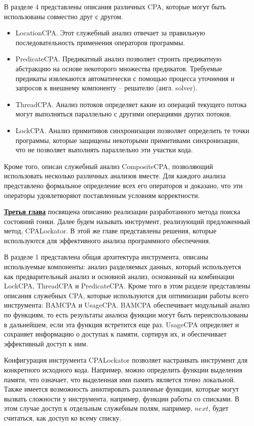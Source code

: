 В разделе 4 представлены описания различных CPA, которые могут быть использованы совместно друг с другом.
\begin{itemize}
\item LocationCPA. Этот служебный анализ отвечает за правильную последовательность применения операторов программы. 
\item PredicateCPA. Предикатный анализ позволяет строить предикатную абстракцию на основе некоторого множества предикатов. 
Требуемые предикаты извлекаются автоматически с помощью процесса уточнения и запросов к внешнему компоненту -- решателю (англ. solver).
\item ThreadCPA. Анализ потоков определяет какие из операций текущего потока могут выполняться параллельно с другими операциями других потоков.
\item LockCPA. Анализ примитивов синхронизации позволяет определить те точки программы, которые защищены некоторыми примитивами синхронизации, что не позволяет выполнять параллельно эти участки кода.
\end{itemize}

Кроме того, описан служебный анализ CompositeCPA, позволяющий использовать несколько различных анализов вместе.
Для каждого анализа представлено формальное определение всех его операторов и доказано, что эти операторы удовлетворяют поставленным условиям корректности.

\underline{\textbf{Третья глава}} посвящена описанию реализации разработанного метода поиска состояний гонки. Далее будем называть инструмент, реализующий предложенный метод, CPALockator. В этой же главе представлены решения, которые используются для эффективного анализа программного обеспечения.

В разделе 1 представлена общая архитектура инструмента, описаны используемые компоненты: анализ разделяемых данных, который используется как предварительный анализ и основной анализ, основанный на комбинации LockCPA, ThreadCPA и PredicateCPA.
Кроме того в этом разделе представлены описания служебных CPA, которые используются  для оптимизации работы всего инструмента: BAMCPA и UsageCPA.
BAMCPA обеспечивает модульный анализ по функциям, то есть результаты анализа функции могут быть переиспользованы в дальнейшем, если эта функция встретится еще раз.
UsageCPA определяет и сохраняет информацию о доступах к памяти, сортируя их, и обеспечивает эффективный доступ к ним.

Конфигурация инструмента CPALockator позволяет настраивать инструмент для конкретного исходного кода.
Например, можно определить функции выделения памяти, что означает, что выделенная ими память является точно локальной.
Также имеется возможность аннотировать различные функции, которые могут вызвать сложности у инструмента, например, функции работы со списками.
В этом случае доступ к отдельным служебным полям, например, $next$, будет считаться, как доступ ко всему списку.

